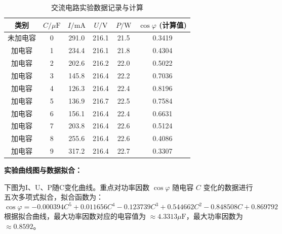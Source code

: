 \documentclass[]{../template/Report}%
\begin{document}
\begin{fullreportonly}
    \begin{table}[H]
        \centering
        \caption{交流电路实验数据记录与计算}
        \label{tab:ac_data}
        \begin{tabular}{cccccc}
            \toprule
            \textbf{类别} & $C / \mu \text{F}$ & $I / \text{mA}$ & $U / \text{V}$ & $P / \text{W}$ & $\cos\varphi$ (计算值) \\
            \midrule
            未加电容        & 0                  & 291.0           & 216.1          & 21.5           & 0.3419              \\
            加电容         & 1                  & 234.4           & 216.1          & 21.8           & 0.4304              \\
            加电容         & 2                  & 202.6           & 216.2          & 22.0           & 0.5022              \\
            加电容         & 3                  & 145.8           & 216.4          & 22.2           & 0.7036              \\
            加电容         & 4                  & 126.3           & 216.4          & 22.4           & 0.8196              \\
            加电容         & 5                  & 136.9           & 216.7          & 22.5           & 0.7584              \\
            加电容         & 6                  & 156.1           & 216.4          & 22.4           & 0.6631              \\
            加电容         & 7                  & 203.8           & 216.4          & 22.6           & 0.5124              \\
            加电容         & 8                  & 255.6           & 216.4          & 22.6           & 0.4086              \\
            加电容         & 9                  & 317.2           & 216.4          & 22.7           & 0.3307              \\
            \bottomrule
        \end{tabular}
    \end{table}

    \def\Cmax{4.3313}
    \def\cosphimax{0.8592}
    \def\fitfunc{-0.000394*x^5 + 0.011656*x^4 - 0.123739*x^3 + 0.544662*x^2 - 0.848508*x + 0.869792}

    \textbf{实验曲线图与数据拟合：}

    下图为I、U、P随C变化曲线。重点对功率因数 $\cos\varphi$ 随电容 $C$ 变化的数据进行五次多项式拟合，拟合函数为：
    $$ \cos\varphi = -0.000394C^5 + 0.011656C^4 - 0.123739C^3 + 0.544662C^2 - 0.848508C + 0.869792 $$
    根据拟合曲线，最大功率因数对应的电容值为 $\approx \Cmax \mu\text{F}$，最大功率因数为 $\approx \cosphimax$。


\end{fullreportonly}
\end{document}
